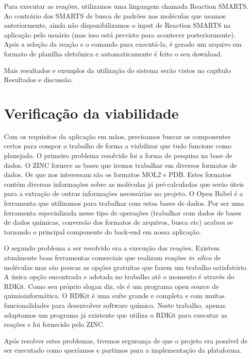 \documentclass{abnt}
\begin{document}
Para executar as reações, utilizamos uma linguagem chamada Reaction SMARTS. Ao contrário
dos SMARTS de busca de padrões nas moléculas que usamos anteriormente, ainda não
disponibilizamos o input de Reaction SMARTS na aplicação pelo usuário (mas isso
está previsto para acontecer posteriormente). Após a seleção da reação e o comando
para executá-la, é gerado um arquivo em formato de planilha eletrônica e automaticamente
é feito o seu download.

Mais resultados e exemplos da utilização do sistema serão vistos no capítulo Resultados
e discussão.

\section{Verificação da viabilidade}

Com os requisitos da aplicação em mãos, precisamos buscar os componentes certos
para compor o trabalho de forma a viabilizar que tudo funcione como planejado. O
primeiro problema resolvido foi a forma de pesquisa na base de dados. O ZINC fornece
as bases que iremos trabalhar em diversos formatos de dados. Os que nos interessam
são os formatos MOL2 e PDB. Estes formatos contém diversas informações sobre as
moléculas já pré-calculadas que serão úteis para a extração de outras informações
necessárias no projeto. O Open Babel é a ferramenta que utilizamos para trabalhar
com estas bases de dados. Por ser uma ferramenta especializada nesse tipo de operações
(trabalhar com dados de bases de dados químicas, conversão dos formatos de arquivos,
busca etc) acabou se tornando o principal componente do back-end em nossa aplicação.

O segundo problema a ser resolvido era a execução das reações. Existem atualmente
boas ferramentas comerciais que realizam reações \textit{in silico} de moléculas mas são
poucas as opções gratuitas que fazem um trabalho satisfatório. A única opção encontrada
e adotada no trabalho até o momento é através do RDKit. Como seu próprio slogan diz,
ele é um programa open source de quimioinformática. O RDKit é uma suíte grande e
completa e com muitas funcionalidades para desenvolver software químico. Neste trabalho,
apenas adaptamos um programa já existente que utiliza o RDKit para executar as reações
e foi fornecido pelo ZINC.

Após resolver estes problemas, tivemos segurança de que o projeto era possível de
ser executado como queríamos e partimos para a implementação da plataforma.
\end{document}
